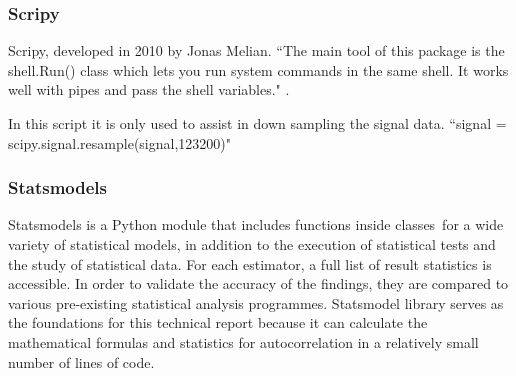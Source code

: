 \subsubsection{Scripy}

Scripy, developed in 2010 by Jonas Melian. ``The main tool of this package is the shell.Run() class which lets you run system commands in the same shell. It works well with pipes and pass the shell variables." \cite{Scripy}.  

In this script it is only used to assist in down sampling the signal data. 
``signal = scipy.signal.resample(signal,123200)" 

\subsubsection{Statsmodels}

Statsmodels is a Python module that includes functions inside classes for a wide variety of statistical models, in addition to the execution of statistical tests and the study of statistical data. For each estimator, a full list of result statistics is accessible. In order to validate the accuracy of the findings, they are compared to various pre-existing statistical analysis programmes. \cite{law2019stumpy} 
Statsmodel library serves as the foundations for this technical report because it can calculate the mathematical formulas and statistics for autocorrelation in a relatively small number of lines of code.

